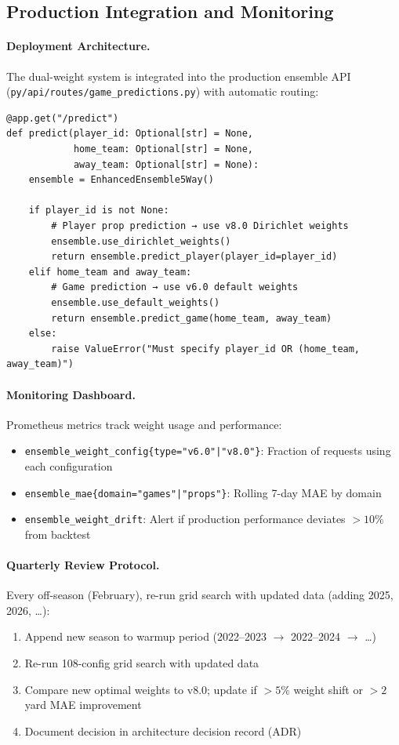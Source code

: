 \subsection{Production Integration and Monitoring}
\label{subsec:production-integration}

\paragraph{Deployment Architecture.}
The dual-weight system is integrated into the production ensemble API (\texttt{py/api/routes/game\_predictions.py}) with automatic routing:
\begin{verbatim}
@app.get("/predict")
def predict(player_id: Optional[str] = None,
            home_team: Optional[str] = None,
            away_team: Optional[str] = None):
    ensemble = EnhancedEnsemble5Way()

    if player_id is not None:
        # Player prop prediction → use v8.0 Dirichlet weights
        ensemble.use_dirichlet_weights()
        return ensemble.predict_player(player_id=player_id)
    elif home_team and away_team:
        # Game prediction → use v6.0 default weights
        ensemble.use_default_weights()
        return ensemble.predict_game(home_team, away_team)
    else:
        raise ValueError("Must specify player_id OR (home_team, away_team)")
\end{verbatim}

\paragraph{Monitoring Dashboard.}
Prometheus metrics track weight usage and performance:
\begin{itemize}
\item \texttt{ensemble\_weight\_config\{type="v6.0"|"v8.0"\}}: Fraction of requests using each configuration
\item \texttt{ensemble\_mae\{domain="games"|"props"\}}: Rolling 7-day MAE by domain
\item \texttt{ensemble\_weight\_drift}: Alert if production performance deviates $>10\%$ from backtest
\end{itemize}

\paragraph{Quarterly Review Protocol.}
Every off-season (February), re-run grid search with updated data (adding 2025, 2026, \ldots):
\begin{enumerate}
\item Append new season to warmup period (2022--2023 $\to$ 2022--2024 $\to$ \ldots)
\item Re-run 108-config grid search with updated data
\item Compare new optimal weights to v8.0; update if $>5\%$ weight shift or $>2$ yard MAE improvement
\item Document decision in architecture decision record (ADR)
\end{enumerate}

